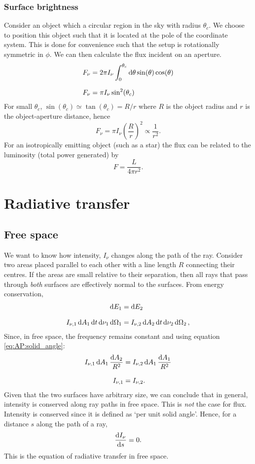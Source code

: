 \subsubsection{Surface brightness}
Consider an object which a circular region in the sky with radius \(\theta_c\).
 We choose to position this object such that it is located at the pole of the coordinate system.
 This is done for convenience such that the setup is rotationally symmetric in \(\phi\).
 We can then calculate the flux incident on an aperture.
%
\begin{align*}
	F_\nu &= 2\pi I_\nu \int_{0}^{\theta_c}\diff\theta \sin(\theta) \cos(\theta)
	\linedrop
	F_\nu &= \pi I_\nu \sin^2(\theta_c)
\end{align*}
%
For small \(\theta_c\), \(\sin(\theta_c) \simeq \tan(\theta_c) = R/r\) where \(R\) is the object radius and \(r\) is the object-aperture distance, hence
%
\[F_\nu = \pi I_\nu  \left( \frac{R}{r} \right) ^2 \propto \frac{1}{r^2}.\]
%
For an isotropically emitting object (such as a star) the flux can be related to the luminosity (total power generated) by
%
\[F = \frac{L}{4\pi r^2}.\]
%
%
%
\section{Radiative transfer}
\subsection{Free space}
We want to know how intensity, \(I_\nu\) changes along the path of the ray.
 Consider two areas placed parallel to each other with a line length \(R\) connecting their centres.
 If the areas are small relative to their separation, then all rays that pass through \emph{both} surfaces are effectively normal to the surfaces.
 From energy conservation,
\begin{align*}
	\dd{E_1} &= \dd{E_2}
	\linedrop
	I_{\nu ,1} \dd{A_1} \dd{t} \dd{\nu_1} \dd{\Omega_1} &= I_{\nu ,2} \dd{A_2} \dd{t} \dd{\nu_2} \dd{\Omega_2} ,	
\end{align*}
%
Since, in free space, the frequency remains constant and using equation \ref{eq:AP:solid_angle}:
%
\begin{align*}
		I_{\nu ,1} \dd{A_1} \frac{\dd{A_2}}{R^2} &= I_{\nu ,2} \dd{A_1} \frac{\dd{A_1}}{R^2}
		\linedrop
		I_{\nu ,1} &= I_{\nu ,2}.
\end{align*}
%
Given that the two surfaces have arbitrary size, we can conclude that in general, intensity is conserved along ray paths in free space.
 This is \emph{not} the case for flux.
 Intensity is conserved since it is defined as `per unit solid angle'.
 Hence, for a distance \(s\) along the path of a ray,
%
\[\dv{I_\nu}{s} = 0.\]
%
This is the equation of radiative transfer in free space.
%
%
